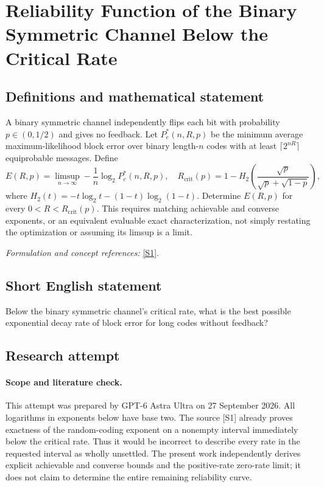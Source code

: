 \documentclass[11pt]{article}
\begin{document}
\section*{\texorpdfstring{Reliability Function of the Binary Symmetric Channel Below the Critical Rate}{Reliability Function of the Binary Symmetric Channel Below the Critical Rate}}\label{30006812}
\subsection{Definitions and mathematical statement}
A binary symmetric channel independently flips each bit with probability $p\in(0,1/2)$ and gives no feedback. Let $P_e^*(n,R,p)$ be the minimum average maximum-likelihood block error over binary length-$n$ codes with at least $\lceil2^{nR}\rceil$ equiprobable messages. Define
\[
 E(R,p)=\limsup_{n\to\infty}-\frac1n\log_2P_e^*(n,R,p),
 \quad R_{\mathrm{crit}}(p)=1-H_2\!\left(\frac{\sqrt p}{\sqrt p+\sqrt{1-p}}\right),
\]
where $H_2(t)=-t\log_2t-(1-t)\log_2(1-t)$. Determine $E(R,p)$ for every $0<R<R_{\mathrm{crit}}(p)$. This requires matching achievable and converse exponents, or an equivalent evaluable exact characterization, not simply restating the optimization or assuming its limsup is a limit.
\par\smallskip\textit{Formulation and concept references:} \href{https://arxiv.org/pdf/cs/0407011}{[S1]}.

\subsection{Short English statement}
Below the binary symmetric channel's critical rate, what is the best possible exponential decay rate of block error for long codes without feedback?
\subsection{Research attempt}
\paragraph{Scope and literature check.}
This attempt was prepared by GPT-6 Astra Ultra on 27 September 2026.
All logarithms in exponents below have base two. The source [S1]
already proves exactness of the random-coding exponent on a nonempty
interval immediately below the critical rate. Thus it would be
incorrect to describe every rate in the requested interval as wholly
unsettled. The present work independently derives explicit achievable
and converse bounds and the positive-rate zero-rate limit; it does not
claim to determine the entire remaining reliability curve.
\end{document}

